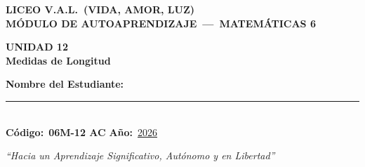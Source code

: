 \documentclass[12pt, letterpaper]{article}
\begin{document}
\begin{center}
  {\Large\bfseries\color{valblue} LICEO V.A.L.\ (VIDA, AMOR, LUZ)}\\[4pt]
  {\large\bfseries MÓDULO DE AUTOAPRENDIZAJE\ ---\ MATEMÁTICAS 6\textdegree}\\[8pt]

  \begin{tcolorbox}[enhanced,arc=6mm,boxrule=2pt,
      colback=valblue,colframe=valdark,halign=center]
    {\Huge\bfseries\color{white} UNIDAD 12}\\[4pt]
    {\Large\bfseries\color{yellow!90!white} Medidas de Longitud}
  \end{tcolorbox}

  \vspace{6pt}
  \begin{tcolorbox}[enhanced,arc=4mm,boxrule=1.5pt,
      colback=white,colframe=valblue,width=0.88\linewidth,halign=center]
    {\bfseries Nombre del Estudiante:}\\[6pt]
    \rule{9cm}{0.5pt}\\[6pt]
    {\bfseries Código:}\ \textbf{06M-12 AC}
    \hspace{2cm}
    {\bfseries Año:}\ \underline{2026}
  \end{tcolorbox}

  \vspace{4pt}
  {\itshape ``Hacia un Aprendizaje Significativo, Autónomo y en Libertad''}
\end{center}
\end{document}
